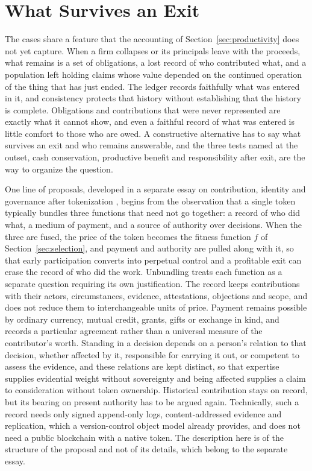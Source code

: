\documentclass[11pt]{article}
\theoremstyle{remark}
\begin{document}
\section{What Survives an Exit}\label{sec:exit}

The cases share a feature that the accounting of Section~\ref{sec:productivity} does not yet capture. When a firm collapses or its principals leave with the proceeds, what remains is a set of obligations, a lost record of who contributed what, and a population left holding claims whose value depended on the continued operation of the thing that has just ended. The ledger records faithfully what was entered in it, and consistency protects that history without establishing that the history is complete. Obligations and contributions that were never represented are exactly what it cannot show, and even a faithful record of what was entered is little comfort to those who are owed. A constructive alternative has to say what survives an exit and who remains answerable, and the three tests named at the outset, cash conservation, productive benefit and responsibility after exit, are the way to organize the question.

One line of proposals, developed in a separate essay on contribution, identity and governance after tokenization \cite{flyxion2026ledger}, begins from the observation that a single token typically bundles three functions that need not go together: a record of who did what, a medium of payment, and a source of authority over decisions. When the three are fused, the price of the token becomes the fitness function $f$ of Section~\ref{sec:selection}, and payment and authority are pulled along with it, so that early participation converts into perpetual control and a profitable exit can erase the record of who did the work. Unbundling treats each function as a separate question requiring its own justification. The record keeps contributions with their actors, circumstances, evidence, attestations, objections and scope, and does not reduce them to interchangeable units of price. Payment remains possible by ordinary currency, mutual credit, grants, gifts or exchange in kind, and records a particular agreement rather than a universal measure of the contributor's worth. Standing in a decision depends on a person's relation to that decision, whether affected by it, responsible for carrying it out, or competent to assess the evidence, and these relations are kept distinct, so that expertise supplies evidential weight without sovereignty and being affected supplies a claim to consideration without token ownership. Historical contribution stays on record, but its bearing on present authority has to be argued again. Technically, such a record needs only signed append-only logs, content-addressed evidence and replication, which a version-control object model already provides, and does not need a public blockchain with a native token. The description here is of the structure of the proposal and not of its details, which belong to the separate essay.
\end{document}
